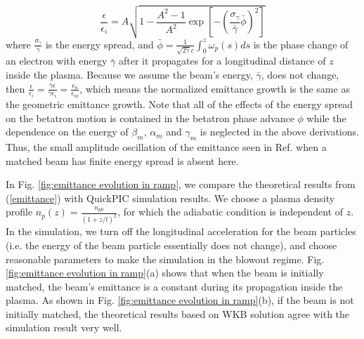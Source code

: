 \documentclass[%
reprint, superscriptaddress,
 amsmath,amssymb, aps,
prstab,
]{revtex4-2}
\begin{document}
\begin{equation} \frac{\epsilon}{\epsilon_i}=A\sqrt{ 1-\frac{A^2
-1}{A^2} \exp[-(\frac{\sigma_\gamma}{\bar \gamma}\bar \phi)^2]}  
\label{emittance} \end{equation} where $\frac{\sigma_\gamma}{\bar
\gamma}$ is the energy spread, and $\bar \phi = \frac{1}{\sqrt{2 \bar
\gamma}c}\int_0^z \omega_p(s) ds$ is the phase change of an electron with energy $\bar \gamma$ after it
propagates for a longitudinal distance of $z$ inside the plasma. Because we assume the beam's energy, $\bar \gamma$, does not change, then $\frac{\epsilon}{\epsilon_i}= \frac{\bar \gamma \epsilon}{\bar \gamma \epsilon_i} = \frac{\epsilon_n}{\epsilon_{ni}}$, which means the normalized emittance growth is the same as the geometric emittance growth. Note that all of the effects of the energy spread on the betatron motion is contained in the betatron phase advance $\phi$ while the dependence on the energy of $\beta_m$, $\alpha_m$ and $\gamma_m$ is neglected in the above derivations. Thus, the small amplitude oscillation of the emittance seen in Ref. \cite{Robert} when a matched beam has finite energy spread is absent here.

In Fig. \ref{fig:emittance evolution in ramp}, we compare the
theoretical results from (\ref{emittance}) with QuickPIC \cite{QuickPIC2006} \cite{QuickPIC2013}  simulation results. We choose a plasma
density profile $n_p(z) = \frac{n_{p0}}{(1+z/l)^2}$, for which the adiabatic condition is independent of $z$. In the
simulation, we turn off the longitudinal acceleration for the beam
particles (i.e. the energy of the beam particle essentially does not change), and
choose reasonable parameters to make the simulation in the blowout
regime. Fig. \ref{fig:emittance evolution in ramp}(a) shows that when the
beam is initially matched, the beam's emittance is a constant during its
propagation inside the plasma. As shown in Fig. \ref{fig:emittance evolution in ramp}(b), if the beam is not initially matched, the
theoretical results based on WKB solution agree with the
simulation result very well.
\end{document}
